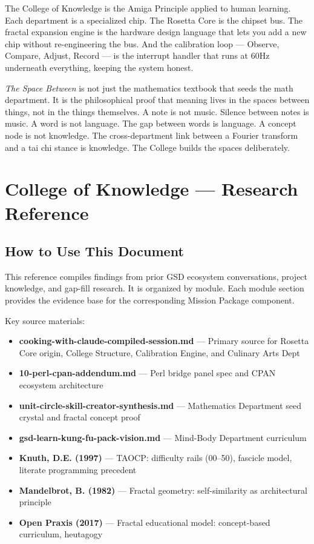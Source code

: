 \documentclass[11pt,letterpaper]{article}
\newcommand{\stageheader}[2]{%
  \noindent\colorbox{#2}{\makebox[\textwidth][l]{%
    \textcolor{white}{\bfseries\sffamily\hspace{6pt}#1\hspace{6pt}}}}%
  \vspace{0.5em}\par%
}
\begin{document}
The College of Knowledge is the Amiga Principle applied to human learning. Each department is a specialized chip. The Rosetta Core is the chipset bus. The fractal expansion engine is the hardware design language that lets you add a new chip without re-engineering the bus. And the calibration loop --- Observe, Compare, Adjust, Record --- is the interrupt handler that runs at 60Hz underneath everything, keeping the system honest.

\textit{The Space Between} is not just the mathematics textbook that seeds the math department. It is the philosophical proof that meaning lives in the spaces between things, not in the things themselves. A note is not music. Silence between notes is music. A word is not language. The gap between words is language. A concept node is not knowledge. The cross-department link between a Fourier transform and a tai chi stance is knowledge. The College builds the spaces deliberately.

\newpage
\stageheader{STAGE 2 --- RESEARCH REFERENCE}{secondary}

\section{College of Knowledge --- Research Reference}

\subsection{How to Use This Document}

This reference compiles findings from prior GSD ecosystem conversations, project knowledge, and gap-fill research. It is organized by module. Each module section provides the evidence base for the corresponding Mission Package component.

Key source materials:
\begin{itemize}[leftmargin=1.5em]
  \item \textbf{cooking-with-claude-compiled-session.md} --- Primary source for Rosetta Core origin, College Structure, Calibration Engine, and Culinary Arts Dept
  \item \textbf{10-perl-cpan-addendum.md} --- Perl bridge panel spec and CPAN ecosystem architecture
  \item \textbf{unit-circle-skill-creator-synthesis.md} --- Mathematics Department seed crystal and fractal concept proof
  \item \textbf{gsd-learn-kung-fu-pack-vision.md} --- Mind-Body Department curriculum
  \item \textbf{Knuth, D.E. (1997)} --- TAOCP: difficulty rails (00--50), fascicle model, literate programming precedent
  \item \textbf{Mandelbrot, B. (1982)} --- Fractal geometry: self-similarity as architectural principle
  \item \textbf{Open Praxis (2017)} --- Fractal educational model: concept-based curriculum, heutagogy
\end{itemize}
\end{document}
